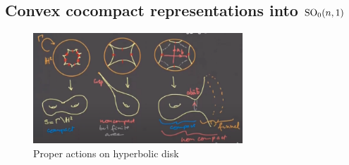 \documentclass{report}
\begin{document}
\subsection{Convex cocompact representations into $\operatorname{{\mathrm{SO}}}_0(n,1)$}
\begin{figure}[ht]
    \centering
    \includegraphics[width=0.7\textwidth]{proper actions.png}
    \caption{Proper actions on hyperbolic disk}
    \label{fig:proper_actions}
\end{figure}
\end{document}
